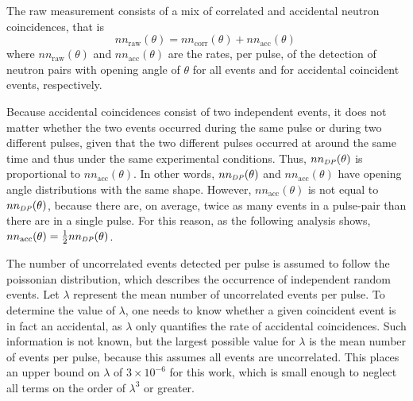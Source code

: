 The raw measurement consists of a mix of correlated and accidental neutron coincidences, that is
\begin{equation}
\label{eq:corr_uncorr}
nn_{\text{raw}}(\theta)= nn_{\text{corr}}(\theta) + nn_{\text{acc}}(\theta) \,
\end{equation}
where $nn_{\text{raw}}(\theta)$ and $nn_{\text{acc}}(\theta)$ are the rates, per pulse, of the detection of neutron pairs with opening angle of $\theta$ for all events and for accidental coincident events, respectively.

Because accidental coincidences consist of two independent events, it does not matter whether the two events occurred during the same pulse or during two different pulses, given that the two different pulses occurred at around the same time and thus under the same experimental conditions.
Thus, $nn_{\scaleto{DP}{4pt}}(\theta)$ is proportional to $nn_{\text{acc}}(\theta)$.
In other words,  $nn_{\scaleto{DP}{4pt}}(\theta)$ and $nn_{\text{acc}}(\theta)$ have opening angle distributions with the same shape.
However, $nn_{\text{acc}}(\theta)$ is not equal to $nn_{\scaleto{DP}{4pt}}(\theta)$, because there are, on average, twice as many events in a pulse-pair than there are in a single pulse.
For this reason, as the following analysis shows,~$nn_{\text{acc}}(\theta) = \frac{1}{2}nn_{\scaleto{DP}{4pt}}(\theta)$.

The number of uncorrelated events detected per pulse is assumed to follow the poissonian distribution, which describes the occurrence of independent random events.
Let $\lambda$ represent the mean number of uncorrelated events per pulse.
To determine the value of $\lambda$, one needs to know whether a given coincident event is in fact an accidental, as $\lambda$ only quantifies the rate of accidental coincidences.
Such information is not known, but the largest possible value for $\lambda$ is the mean number of events per pulse, because this assumes all events are uncorrelated.
This places an upper bound on $\lambda$ of $3\times 10^{-6}$ for this work, which is small enough to neglect all terms on the order of $\lambda^3$ or greater.

